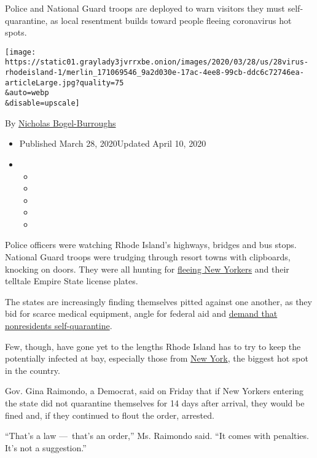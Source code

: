 Police and National Guard troops are deployed to warn visitors they must
self-quarantine, as local resentment builds toward people fleeing
coronavirus hot spots.

\texttt{[image: https://static01.graylady3jvrrxbe.onion/images/2020/03/28/us/28virus-rhodeisland-1/merlin\_171069546\_9a2d030e-17ac-4ee8-99cb-ddc6c72746ea-articleLarge.jpg?quality=75\\\&auto=webp\\\&disable=upscale]}

By
\href{https://www.nytimes3xbfgragh.onion/by/nicholas-bogel-burroughs}{Nicholas
Bogel-Burroughs}

\begin{itemize}
\item
  Published March 28, 2020Updated April 10, 2020
\item
  \begin{itemize}
  \item
  \item
  \item
  \item
  \item
  \end{itemize}
\end{itemize}

Police officers were watching Rhode Island's highways, bridges and bus
stops. National Guard troops were trudging through resort towns with
clipboards, knocking on doors. They were all hunting for
\href{https://www.nytimes3xbfgragh.onion/2020/04/10/nyregion/coronavirus-second-homes-travel.html}{fleeing
New Yorkers} and their telltale Empire State license plates.

The states are increasingly finding themselves pitted against one
another, as they bid for scarce medical equipment, angle for federal aid
and
\href{https://www.nytimes3xbfgragh.onion/2020/03/25/us/coronavirus-united-states.html}{demand
that nonresidents self-quarantine}.

Few, though, have gone yet to the lengths Rhode Island has to try to
keep the potentially infected at bay, especially those from
\href{https://www.nytimes3xbfgragh.onion/2020/04/10/nyregion/coronavirus-second-homes-travel.html}{New
York}, the biggest hot spot in the country.

Gov. Gina Raimondo, a Democrat, said on Friday that if New Yorkers
entering the state did not quarantine themselves for 14 days after
arrival, they would be fined and, if they continued to flout the order,
arrested.

``That's a law ---~that's an order,'' Ms. Raimondo said. ``It comes with
penalties. It's not a suggestion.''

